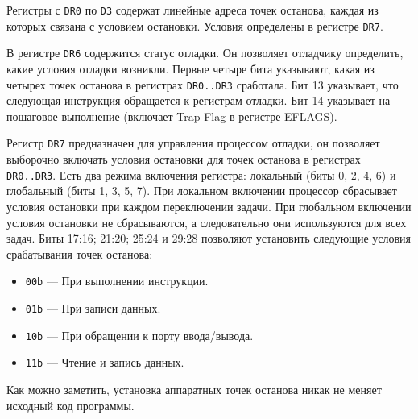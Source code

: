 Регистры с \verb!DR0! по \verb!D3! содержат линейные адреса точек останова,
каждая из которых связана с условием остановки. Условия определены в регистре
\verb!DR7!.

В регистре \verb!DR6! содержится статус отладки. Он позволяет отладчику
определить, какие условия отладки возникли. Первые четыре бита указывают, какая
из четырех точек останова в регистрах \verb!DR0..DR3! сработала. Бит 13
указывает, что следующая инструкция обращается к регистрам отладки. Бит 14
указывает на пошаговое выполнение (включает Trap Flag в регистре EFLAGS). 

Регистр \verb!DR7! предназначен для управления процессом отладки, он позволяет
выборочно включать условия остановки для точек останова в регистрах
\verb!DR0..DR3!. Есть два режима включения регистра: локальный (биты 0, 2, 4,
6) и глобальный (биты 1, 3, 5, 7). При локальном включении процессор сбрасывает
условия остановки при каждом переключении задачи. При глобальном включении
условия остановки не сбрасываются, а следовательно они используются для всех
задач. Биты 17:16; 21:20; 25:24 и 29:28 позволяют установить следующие условия
срабатывания точек останова:
\begin{itemize}
  \item \verb!00b! --- При выполнении инструкции.
  \item \verb!01b! --- При записи данных.
  \item \verb!10b! --- При обращении к порту ввода/вывода.
  \item \verb!11b! --- Чтение и запись данных.
\end{itemize}

Как можно заметить, установка аппаратных точек останова никак не меняет исходный
код программы.
